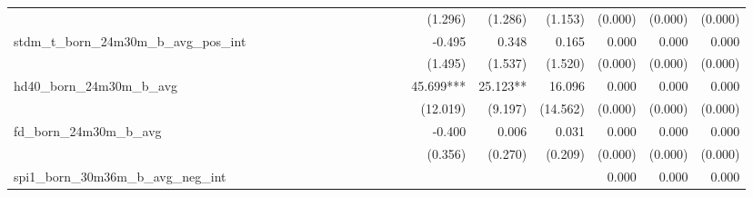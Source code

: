 \begin{tabular}{lrrrrrrrrrrrrrrrrrr}
                                            &              &              &              &              &              &              &              &              &               &              &              &               &      (1.296) &      (1.286) &       (1.153) &      (0.000) &      (0.000) &       (0.000) \\ 
stdm\_t\_born\_24m30m\_b\_avg\_pos\_int     &              &              &              &              &              &              &              &              &               &              &              &               &       -0.495 &        0.348 &         0.165 &        0.000 &        0.000 &         0.000 \\ 
                                            &              &              &              &              &              &              &              &              &               &              &              &               &      (1.495) &      (1.537) &       (1.520) &      (0.000) &      (0.000) &       (0.000) \\ 
hd40\_born\_24m30m\_b\_avg                  &              &              &              &              &              &              &              &              &               &              &              &               &    45.699*** &     25.123** &        16.096 &        0.000 &        0.000 &         0.000 \\ 
                                            &              &              &              &              &              &              &              &              &               &              &              &               &     (12.019) &      (9.197) &      (14.562) &      (0.000) &      (0.000) &       (0.000) \\ 
fd\_born\_24m30m\_b\_avg                    &              &              &              &              &              &              &              &              &               &              &              &               &       -0.400 &        0.006 &         0.031 &        0.000 &        0.000 &         0.000 \\ 
                                            &              &              &              &              &              &              &              &              &               &              &              &               &      (0.356) &      (0.270) &       (0.209) &      (0.000) &      (0.000) &       (0.000) \\ 
spi1\_born\_30m36m\_b\_avg\_neg\_int        &              &              &              &              &              &              &              &              &               &              &              &               &              &              &               &        0.000 &        0.000 &         0.000 \\ 

\end{tabular}
